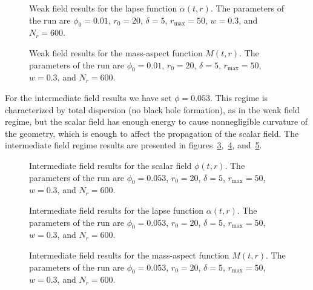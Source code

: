 \documentclass[a4paper,11pt]{article}
\renewcommand{\a}{\alpha}
\begin{document}
\begin{figure}[ht]
  \centering
  
  \caption[Weak field results for the lapse function $\a(t,r)$.]{Weak field results for the lapse function $\a(t,r)$. The parameters of the run are $\phi_{0}=0.01$, $r_{0}=20$, $\delta=5$, $r_{\max}=50$, $w=0.3$, and $N_{r}=600$.}
  \label{fig:alpha_weak}
\end{figure}

\begin{figure}[ht]
  \centering
  
  \caption[Weak field results for the mass-aspect function $M(t,r)$.]{Weak field results for the mass-aspect function $M(t,r)$. The parameters of the run are $\phi_{0}=0.01$, $r_{0}=20$, $\delta=5$, $r_{\max}=50$, $w=0.3$, and $N_{r}=600$.}
  \label{fig:mass_weak}
\end{figure}

For the intermediate field results we have set $\phi=0.053$. This regime is characterized by total dispersion (no black hole formation), as in the weak field regime, but the scalar field has enough energy to cause nonnegligible curvature of the geometry, which is enough to affect the propagation of the scalar field. The intermediate field regime results are presented in figures~\ref{fig:phi_inter},~\ref{fig:alpha_inter}, and~\ref{fig:mass_inter}.

\begin{figure}[ht]
  \centering
  
  \caption[Intermediate field results for the scalar field $\phi(t,r)$.]{Intermediate field results for the scalar field $\phi(t,r)$. The parameters of the run are $\phi_{0}=0.053$, $r_{0}=20$, $\delta=5$, $r_{\max}=50$, $w=0.3$, and $N_{r}=600$.}
  \label{fig:phi_inter}
\end{figure}

\begin{figure}[ht]
  \centering
  
  \caption[Intermediate field results for the lapse function $\a(t,r)$.]{Intermediate field results for the lapse function $\a(t,r)$. The parameters of the run are $\phi_{0}=0.053$, $r_{0}=20$, $\delta=5$, $r_{\max}=50$, $w=0.3$, and $N_{r}=600$.}
  \label{fig:alpha_inter}
\end{figure}

\begin{figure}[ht]
  \centering
  
  \caption[Intermediate field results for the mass-aspect function $M(t,r)$.]{Intermediate field results for the mass-aspect function $M(t,r)$. The parameters of the run are $\phi_{0}=0.053$, $r_{0}=20$, $\delta=5$, $r_{\max}=50$, $w=0.3$, and $N_{r}=600$.}
  \label{fig:mass_inter}
\end{figure}
\end{document}
